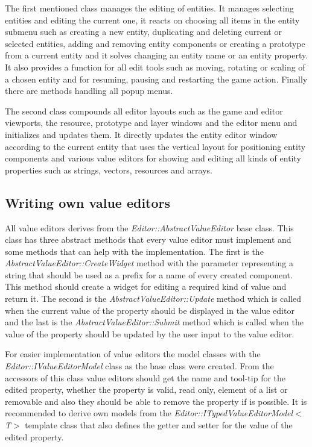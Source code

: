 The first mentioned class manages the editing of entities. It manages selecting entities and editing the current one, it reacts on choosing all items in the entity submenu such as creating a new entity, duplicating and deleting current or selected entities, adding and removing entity components or creating a prototype from a current entity and it solves changing an entity name or an entity property. It also provides a function for all edit tools such as moving, rotating or scaling of a chosen entity and for resuming, pausing and restarting the game action. Finally there are methods handling all popup menus.

The second class compounds all editor layouts such as the game and editor viewports, the resource, prototype and layer windows and the editor menu and initializes and updates them. It directly updates the entity editor window according to the current entity that uses the vertical layout for positioning entity components and various value editors for showing and editing all kinds of entity properties such as strings, vectors, resources and arrays.

\subsection{Writing own value editors}

All value editors derives from the \emph{Editor::AbstractValueEditor} base class. This class has three abstract methods that every value editor must implement and some methods that can help with the implementation. The first is the \emph{AbstractValueEditor::CreateWidget} method with the parameter representing a string that should be used as a prefix for a name of every created component. This method should create a widget for editing a required kind of value and return it. The second is the \emph{AbstractValueEditor::Update} method which is called when the current value of the property should be displayed in the value editor and the last is the \emph{AbstractValueEditor::Submit} method which is called when the value of the property should be updated by the user input to the value editor.

For easier implementation of value editors the model classes with the \emph{Editor::IValueEditorModel} class as the base class were created. From the accessors of this class value editors should get the name and tool-tip for the edited property, whether the property is valid, read only, element of a list or removable and also they should be able to remove the property if is possible. It is recommended to derive own models from the \emph{Editor::ITypedValueEditor\-Model$<$T$>$} template class that also defines the getter and setter for the value of the edited property.

